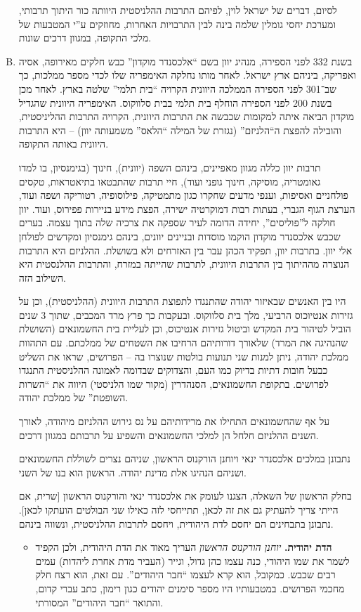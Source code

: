 \documentclass[]{article}
\begin{document}
\begin{enumerate}[A.]
        לסיום, דברים של ישראל לוין, לפיהם התרבות ההלניסטית היוותה כור היתוך תרבותי, ומערכת יחסי גומלין שלמה בינה לבין התרבויות האחרות, מחוזקים ע''י המטבעות של מלכי התקופה, במגוון דרכים שונות. 
        
        \item בשנת 332 לפני הספירה, מנהיג יוון בשם ``אלכסנדר מוקדון'' כבש חלקים מאירופה, אסיה ואפריקה, ביניהם ארץ ישראל. לאחר מותו נחלקה האימפריה שלו לכדי מספר ממלכות, כך שב־301 לפני הספירה הממלכה היוונית הקרויה ``בית תלמי'' שלטה בארץ. לאחר מכן בשנת 200 לפני הספירה הוחלף בית תלמי בבית סלווקוס. האימפריה היוונית שהגדיל מוקדון הביאה איתה למקומות שכבשה את התרבות היוונית, הקרויה התרבות ההליניסטית, והובילה להפצת ה``הלניזם'' (נגזרת של המילה ``הלאס'' משמעותה יוון) – היא התרבות היוונית באותה התקופה. 
        
        תרבות יוון כללה מגוון מאפיינים, בינהם השפה (יוונית), חינוך (בגימנסיון, בו למדו גאומטריה, מוסיקה, חינוך גופני ועוד), חיי תרבות שהתבטאו בתיאטראות, טקסים פולחניים ואסיפות, וענפי מדעים שחקרו כגון מתמטיקה, פילוסופיה, רטוריקה ושפה ועוד, הערצת הגוף הגברי, בעתות רבות דמוקרטיה ישירה, הפצת מידע בניירות פפירוס, ועוד. יוון חולקה ל''פוליסים'', יחידה הדומה לעיר שספקה את צרכיה שלה בתוך עצמה. בערים שכבש אלכסנדר מוקדון הוקמו מוסדות ובניינים יוונים, בינהם גימנסיון ומקדשים לפולחן אלי יוון. בתרבות יוון, תפקיד הכהן עבר בין האזרחים ולא בשושלת. ההלניזם היא התרבות הנוצרה מההיתוך בין התרבות היוונית, לתרבות שהייתה במזרח, והתרבות ההלנסטית היא השילוב הזה. 
        
        היו בין האנשים שבאיזור יהודה שהתנגדו לתפוצת התרבות היוונית (ההלניסטית), וכן על גזירות אנטיוכוס הרביעי, מלך בית סלווקוס. ובעקבות כך פרץ מרד המכבים, שתוך 3 שנים הוביל לטיהור בית המקדש וביטול גזירות אנטיכוס, וכן לעליית בית החשמונאים (השושלת שהנהיגה את המרד) שלאורך דורותיהם הרחיבו את השטחים של ממלכתם. עם התהוות ממלכת יהודה, ניתן למנות שני תנועות בולטות שנוצרו בה – הפרושים, שראו את השליט כבעל חובות דתיות בדיוק כמו העם, והצדוקים שבדומה לאמונה ההלניסטית התנגדו לפרושים. בתקופת החשמונאים, הסנהדרין (מקור שמו הלניסטי) היווה את ``השרות השופטת'' של ממלכת יהודה. 
        
        על אף שהחשמונאים התחילו את מרידותיהם על נס גירוש ההלניזם מיהודה, לאורך השנים ההלניזם חלחל הן למלכי החשמונאים והשפיע על תרבותם במגוון דרכים. 
        
        נתבונן במלכים אלכסנדר ינאי ויוחנן הורקנוס הראשון, שניהם נצרים לשוללת החשמונאים ושניהם הנהיגו אלת מדינת יהודה. הראשון הוא בנו של השני. 
        
        בחלק הראשון של השאלה, הצגנו לעומק את אלכסנדר ינאי והורקנוס הראשון [שרית, אם הייתי צריך להעתיק גם את זה לכאן, תתייחסי לזה כאילו שני הבוּלטים הועתקו לכאן]. נתבונן בתבחינים הם יחסם לדת היהודית, ויחסם לתרבות ההלניסטית, ונשווה בינהם. 
        \begin{itemize}
            \item \textbf{הדת יהודית. }\textit{יוחנן הורקנוס הראשון} העריך מאוד את הדת היהודית, ולכן הקפיד לשמר את שמו היהודי, כנה עצמו כהן גדול, וגייר (העביר מדת אחרת ליהדות) עמים רבים שכבש. כמקובל, הוא קרא לעצמו ``חבר היהודים''. עם זאת, הוא רצח חלק מחכמי הפרושים. במטבעותיו היו מספר סימנים יהודים כגון רימון, כתב עברי קדום, והתואר  ``חבר היהודים'' המסורתי. 
            

\end{itemize}
\end{enumerate}
\end{document}
